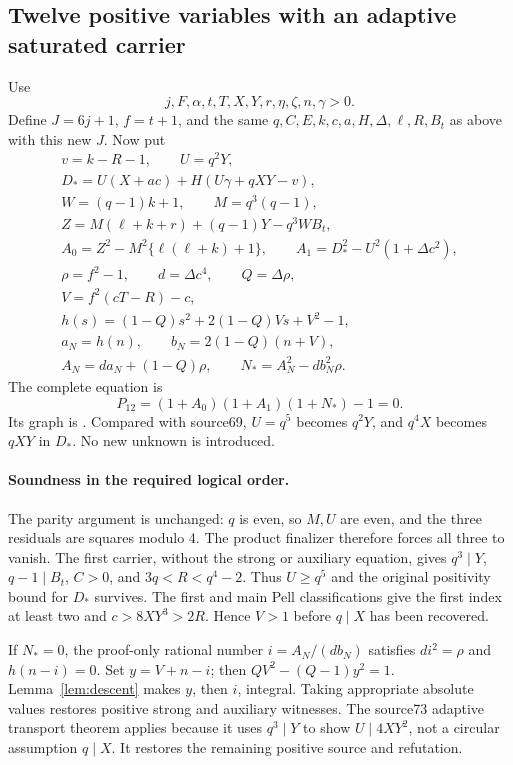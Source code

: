 \subsection{Twelve positive variables with an adaptive saturated carrier}
Use
\[
 j,F,\alpha,t,T,X,Y,r,\eta,\zeta,n,\gamma>0.
\]
Define $J=6j+1$, $f=t+1$, and the same $q,C,E,k,c,a,H,\Delta,\ell,R,B_t$
as above with this new $J$. Now put
\begin{gather*}
 v=k-R-1,\qquad U=q^2Y,\\
 D_*=U(X+ac)+H(U\gamma+qXY-v),\\
 W=(q-1)k+1,\qquad M=q^3(q-1),\\
 Z=M(\ell+k+r)+(q-1)Y-q^3WB_t,\\
 A_0=Z^2-M^2\{\ell(\ell+k)+1\},\qquad A_1=D_*^2-U^2(1+\Delta c^2),\\
 \rho=f^2-1,\qquad d=\Delta c^4,\qquad Q=\Delta\rho,\\
 V=f^2(cT-R)-c,\qquad \\
 h(s)=(1-Q)s^2+2(1-Q)Vs+V^2-1,\\
 a_N=h(n),\qquad b_N=2(1-Q)(n+V),\\
 A_N=da_N+(1-Q)\rho,\qquad N_*=A_N^2-db_N^2\rho.
\end{gather*}
The complete equation is
\begin{equation}\label{eq:positive12}
 P_{12}=(1+A_0)(1+A_1)(1+N_*)-1=0.
\end{equation}
Its graph is . Compared with source69,
$U=q^5$ becomes $q^2Y$, and $q^4X$ becomes $qXY$ in $D_*$.
No new unknown is introduced.

\paragraph{Soundness in the required logical order.}
The parity argument is unchanged: $q$ is even, so $M,U$ are even, and
the three residuals are squares modulo 4. The product finalizer therefore
forces all three to vanish. The first carrier, without the strong or
auxiliary equation, gives $q^3\mid Y$, $q-1\mid B_t$, $C>0$, and
$3q<R<q^4-2$. Thus $U\ge q^5$ and the original positivity bound for
$D_*$ survives. The first and main Pell classifications give the first
index at least two and $c>8XY^3>2R$. Hence $V>1$ before $q\mid X$
has been recovered.

If $N_*=0$, the proof-only rational number $i=A_N/(db_N)$ satisfies
$di^2=\rho$ and $h(n-i)=0$. Set $y=V+n-i$; then
$QV^2-(Q-1)y^2=1$. Lemma~\ref{lem:descent} makes $y$, then $i$, integral.
Taking appropriate absolute values restores positive strong and auxiliary
witnesses. The source73 adaptive transport theorem applies because it
uses $q^3\mid Y$ to show $U\mid4XY^2$, not a circular assumption
$q\mid X$. It restores the remaining positive source and refutation.

